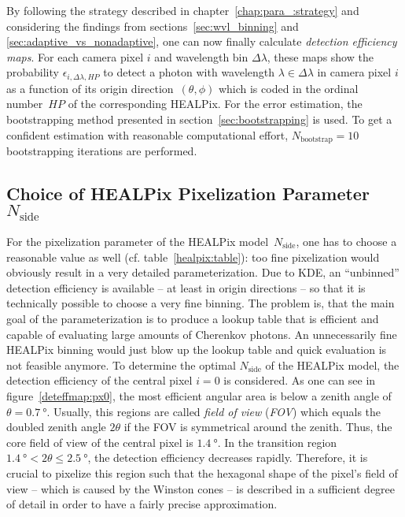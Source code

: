 By following the strategy described in chapter~\ref{chap:para_:strategy} and considering the findings from sections~\ref{sec:wvl_binning} and \ref{sec:adaptive_vs_nonadaptive}, one can now finally calculate \textit{detection efficiency maps}. For each camera pixel $i$ and wavelength bin $\Delta\lambda$, these maps show the probability $\epsilon_{i,\Delta\lambda,HP}$ to detect a photon with wavelength $\lambda\in\Delta\lambda$ in camera pixel $i$ as a function of its origin direction~$(\theta,\phi)$ which is coded in the ordinal number~$HP$ of the corresponding HEALPix. For the error estimation, the bootstrapping method presented in section~\ref{sec:bootstrapping} is used. To get a confident estimation with reasonable computational effort, $N_\text{bootstrap} = \num{10}$ bootstrapping iterations are performed.\\

\subsection{Choice of HEALPix Pixelization Parameter $N_\text{side}$}

For the pixelization parameter of the HEALPix model~$N_\text{side}$, one has to choose a reasonable value as well (cf. table~\ref{healpix:table}): too fine pixelization would obviously result in a very detailed parameterization. Due to KDE, an \enquote{unbinned} detection efficiency is available -- at least in origin directions -- so that it is technically possible to choose a very fine binning. The problem is, that the main goal of the \iceact parameterization is to produce a lookup table that is efficient and capable of evaluating large amounts of Cherenkov photons. An unnecessarily fine HEALPix binning would just blow up the lookup table and quick evaluation is not feasible anymore. To determine the optimal $N_\text{side}$ of the HEALPix model, the detection efficiency of the central pixel $i=0$ is considered. As one can see in figure~\ref{deteffmap:px0}, the most efficient angular area is below a zenith angle of $\theta=\SI{0.7}{\degree}$. Usually, this regions are called \textit{field of view} (\textit{FOV}) which equals the doubled zenith angle $2\theta$ if the FOV is symmetrical around the zenith. Thus, the core field of view of the central pixel is $\SI{1.4}{\degree}$. In the transition region $\SI{1.4}{\degree} < 2\theta \leq \SI{2.5}{\degree}$, the detection efficiency decreases rapidly. Therefore, it is crucial to pixelize this region such that the hexagonal shape of the pixel's field of view -- which is caused by the Winston cones -- is described in a sufficient degree of detail in order to have a fairly precise approximation.


